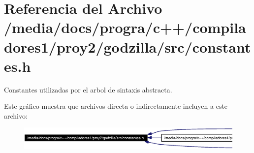 \section{Referencia del Archivo /media/docs/progra/c++/compiladores1/proy2/godzilla/src/constantes.h}
\label{constantes_8h}
Constantes utilizadas por el arbol de sintaxis abstracta. 



Este gr\'{a}fico muestra que archivos directa o indirectamente incluyen a este archivo:\begin{figure}[H]
\begin{center}
\leavevmode
\includegraphics[width=420pt]{constantes_8h__dep__incl}
\end{center}
\end{figure}
